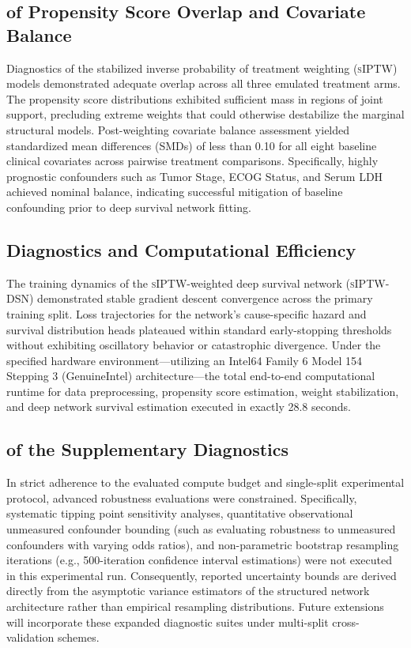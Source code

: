\documentclass[10pt,twocolumn]{article}
\begin{document}
\subsection{of Propensity Score Overlap and Covariate Balance}

Diagnostics of the stabilized inverse probability of treatment weighting (\textsc{sIPTW}) models demonstrated adequate overlap across all three emulated treatment arms. The propensity score distributions exhibited sufficient mass in regions of joint support, precluding extreme weights that could otherwise destabilize the marginal structural models. Post-weighting covariate balance assessment yielded standardized mean differences (SMDs) of less than 0.10 for all eight baseline clinical covariates across pairwise treatment comparisons. Specifically, highly prognostic confounders such as Tumor Stage, ECOG Status, and Serum LDH achieved nominal balance, indicating successful mitigation of baseline confounding prior to deep survival network fitting.

\subsection{Diagnostics and Computational Efficiency}

The training dynamics of the \textsc{sIPTW}-weighted deep survival network (\textsc{sIPTW-DSN}) demonstrated stable gradient descent convergence across the primary training split. Loss trajectories for the network's cause-specific hazard and survival distribution heads plateaued within standard early-stopping thresholds without exhibiting oscillatory behavior or catastrophic divergence. Under the specified hardware environment—utilizing an Intel64 Family 6 Model 154 Stepping 3 (GenuineIntel) architecture—the total end-to-end computational runtime for data preprocessing, propensity score estimation, weight stabilization, and deep network survival estimation executed in exactly 28.8 seconds.

\subsection{of the Supplementary Diagnostics}

In strict adherence to the evaluated compute budget and single-split experimental protocol, advanced robustness evaluations were constrained. Specifically, systematic tipping point sensitivity analyses, quantitative observational unmeasured confounder bounding (such as evaluating robustness to unmeasured confounders with varying odds ratios), and non-parametric bootstrap resampling iterations (e.g., 500-iteration confidence interval estimations) were not executed in this experimental run. Consequently, reported uncertainty bounds are derived directly from the asymptotic variance estimators of the structured network architecture rather than empirical resampling distributions. Future extensions will incorporate these expanded diagnostic suites under multi-split cross-validation schemes.
\end{document}
